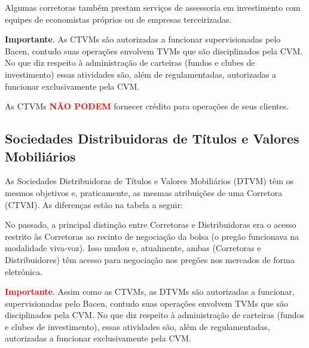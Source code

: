 \documentclass{article}\usepackage[]{graphicx}\usepackage[]{xcolor}
\begin{document}
Algumas corretoras também prestam serviços de assessoria em investimento com equipes de economistas
próprios ou de empresas terceirizadas.\par

\textbf{Importante}. As CTVMs são autorizadas a funcionar supervisionadas pelo Bacen, contudo suas operações
envolvem TVMs que são disciplinados pela CVM. No que diz respeito à administração de carteiras (fundos e
clubes de investimento) essas atividades são, além de regulamentadas, autorizadas a funcionar exclusivamente pela CVM.\par

As CTVMs \textcolor{red}{\textbf{NÃO PODEM}} fornecer crédito para operações de seus clientes.

\subsection*{Sociedades Distribuidoras de Títulos e Valores Mobiliários}

As Sociedades Distribuidoras de Títulos e Valores Mobiliários (DTVM) têm os mesmos objetivos e, 
praticamente, as mesmas atribuições de uma Corretora (CTVM). As diferenças estão na tabela a seguir:


\begin{table}[H]
\centering
\caption{Diferença entre Corretora e Distribuidora.}
\end{table}

No passado, a principal distinção entre Corretoras e Distribuidoras era o acesso restrito às 
Corretoras ao recinto de negociação da bolsa (o pregão funcionava na modalidade viva-voz). 
Isso mudou e, atualmente, ambas (Corretoras e Distribuidores) têm acesso para negociação nos 
pregões nos mercados de forma eletrônica.\par

\textcolor{red}{\textbf{Importante}}. Assim como as CTVMs, as DTVMs são autorizadas a funcionar, supervisionadas pelo Bacen, 
contudo suas operações envolvem TVMs que são disciplinados pela CVM. No que diz respeito à administração de carteiras 
(fundos e clubes de investimento), essas atividades são, além de regulamentadas, autorizadas a funcionar exclusivamente pela CVM.\par
\end{document}
